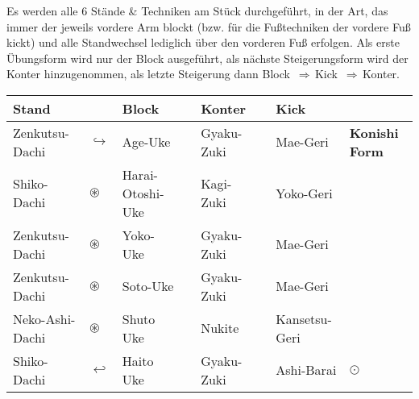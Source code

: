 \null\vfill\null
	\begin{center}
		\parbox{\textwidth-2\tabcolsep}{Es werden alle 6 Stände \& Techniken am Stück durchgeführt, in der Art, das immer der jeweils vordere Arm blockt (bzw. für die Fußtechniken der vordere Fuß kickt) und alle Standwechsel lediglich über den vorderen Fuß erfolgen. Als erste Übungsform wird nur der Block ausgeführt, als nächste Steigerungsform wird der Konter hinzugenommen, als letzte Steigerung dann \mbox{Block \(\Rightarrow\)\,Kick \(\Rightarrow\)\,Konter.}}
	\end{center}
	\begin{tabularx}{\textwidth}{lllXlXll}
		Stand	&&Block	&&Konter	&&Kick&\\
		\midrule
		Zenkutsu-Dachi 	& \(\hookrightarrow\) & Age-Uke	&&Gyaku-Zuki	&&Mae-Geri&\textbf{Konishi Form}\\
		Shiko-Dachi 	& \(\circledast\) & Harai-Otoshi-Uke	&&Kagi-Zuki&&Yoko-Geri&\\
		Zenkutsu-Dachi	& \(\circledast\) & Yoko-Uke	&&Gyaku-Zuki&&Mae-Geri&\\
		Zenkutsu-Dachi	& \(\circledast\) & Soto-Uke	&&Gyaku-Zuki&&Mae-Geri&\\
		Neko-Ashi-Dachi	& \(\circledast\) & Shuto Uke	&&Nukite&&Kansetsu-Geri&\\
		Shiko-Dachi	& \(\hookleftarrow\) & Haito Uke	&&Gyaku-Zuki&&Ashi-Barai& \(\odot\)\\
		\midrule
	\end{tabularx}\\\null\vfill\null